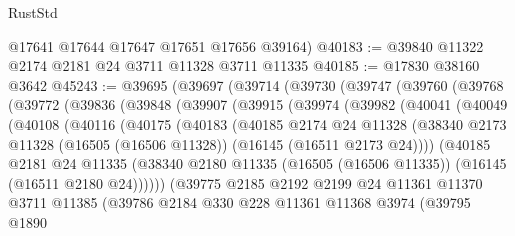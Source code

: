 \begin{lexlean}{RustStd}
\begin{coremodule}
      @17641
      @17644
      @17647
      @17651
      @17656
      @39164)
@40183 := @39840 @11322 @2174 @2181 @24 @3711 @11328 @3711 @11335
@40185 := @17830 @38160 @3642
@45243 := @39695
    (@39697
      (@39714
        (@39730
          (@39747
            (@39760
              (@39768
                (@39772
                  (@39836
                    (@39848
                      (@39907
                        (@39915
                          (@39974
                            (@39982
                              (@40041
                                (@40049
                                  (@40108
                                    (@40116
                                      (@40175
                                        (@40183
                                          (@40185
                                            @2174
                                            @24
                                            @11328
                                            (@38340
                                              @2173
                                              @11328
                                              (@16505 (@16506 @11328))
                                              (@16145 (@16511 @2173 @24))))
                                          (@40185
                                            @2181
                                            @24
                                            @11335
                                            (@38340
                                              @2180
                                              @11335
                                              (@16505 (@16506 @11335))
                                              (@16145 (@16511 @2180 @24))))))
                                      (@39775
                                        @2185
                                        @2192
                                        @2199
                                        @24
                                        @11361
                                        @11370
                                        @3711
                                        @11385
                                        (@39786
                                          @2184
                                          @330
                                          @228
                                          @11361
                                          @11368
                                          @3974
                                          (@39795
                                            @1890

\end{coremodule}
\end{lexlean}
